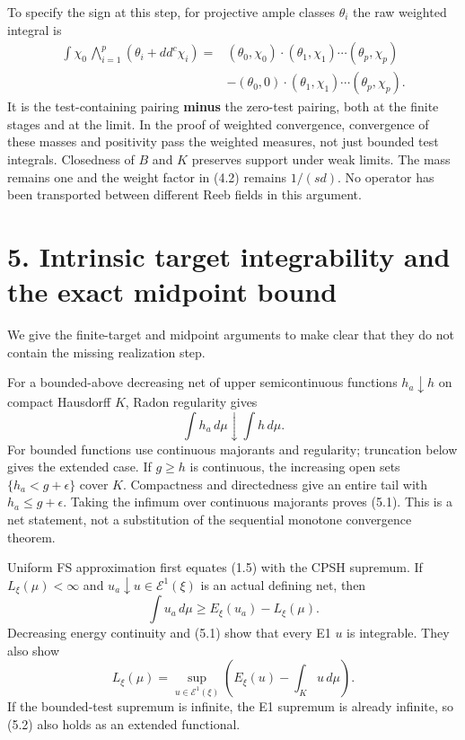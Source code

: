 \documentclass[
  10pt,
]{article}
\begin{document}
To specify the sign at this step, for projective ample classes
\(\theta_i\) the raw weighted integral is \[
 \begin{split}
 \int\chi_0\,\bigwedge_{i=1}^p(\theta_i+dd^c\chi_i)
  ={}&(\theta_0,\chi_0)\cdot(\theta_1,\chi_1)\cdots(\theta_p,\chi_p)\\
     &-(\theta_0,0)\cdot(\theta_1,\chi_1)\cdots(\theta_p,\chi_p).
 \end{split}                                                   \tag{4.3}
\] It is the test-containing pairing \textbf{minus} the zero-test
pairing, both at the finite stages and at the limit. In the proof of
weighted convergence, convergence of these masses and positivity pass
the weighted measures, not just bounded test integrals. Closedness of
\(B\) and \(K\) preserves support under weak limits. The mass remains
one and the weight factor in (4.2) remains \(1/(sd)\). No operator has
been transported between different Reeb fields in this argument.

\section{5. Intrinsic target integrability and the exact midpoint
bound}\label{intrinsic-target-integrability-and-the-exact-midpoint-bound}

We give the finite-target and midpoint arguments to make clear that they
do not contain the missing realization step.

For a bounded-above decreasing net of upper semicontinuous functions
\(h_a\downarrow h\) on compact Hausdorff \(K\), Radon regularity gives
\[
                        \int h_a\,d\mu\downarrow\int h\,d\mu.    \tag{5.1}
\] For bounded functions use continuous majorants and regularity;
truncation below gives the extended case. If \(g\geq h\) is continuous,
the increasing open sets \(\{h_a<g+\epsilon\}\) cover \(K\). Compactness
and directedness give an entire tail with \(h_a\leq g+\epsilon\). Taking
the infimum over continuous majorants proves (5.1). This is a net
statement, not a substitution of the sequential monotone convergence
theorem.

Uniform FS approximation first equates (1.5) with the CPSH supremum. If
\(L_\xi(\mu)<\infty\) and \(u_a\downarrow u\in\mathcal E^1(\xi)\) is an
actual defining net, then \[
                  \int u_a\,d\mu\geq E_\xi(u_a)-L_\xi(\mu).
\] Decreasing energy continuity and (5.1) show that every E1 \(u\) is
integrable. They also show \[
 L_\xi(\mu)=\sup_{u\in\mathcal E^1(\xi)}
                    \left(E_\xi(u)-\int_Ku\,d\mu\right).        \tag{5.2}
\] If the bounded-test supremum is infinite, the E1 supremum is already
infinite, so (5.2) also holds as an extended functional.
\end{document}
